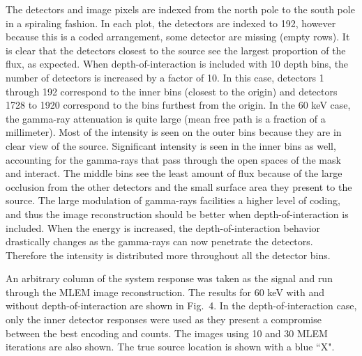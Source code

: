 \documentclass[10pt]{article}
\begin{document}
The detectors and image pixels are indexed from the north pole to the south pole in a spiraling fashion. In each plot, the detectors are indexed to 192, however because this is a coded arrangement, some detector are missing (empty rows). It is clear that the detectors closest to the source see the largest proportion of the flux, as expected. When depth-of-interaction is included with 10 depth bins, the number of detectors is increased by a factor of 10. In this case, detectors 1 through 192 correspond to the inner bins (closest to the origin) and detectors 1728 to 1920 correspond to the bins furthest from the origin. In the 60 keV case, the gamma-ray attenuation is quite large (mean free path is a fraction of a millimeter). Most of the intensity is seen on the outer bins because they are in clear view of the source. Significant intensity is seen in the inner bins as well, accounting for the gamma-rays that pass through the open spaces of the mask and interact. The middle bins see the least amount of flux because of the large occlusion from the other detectors and the small surface area they present to the source. The large modulation of gamma-rays facilities a higher level of coding, and thus the image reconstruction should be better when depth-of-interaction is included. When the energy is increased, the depth-of-interaction behavior drastically changes as the gamma-rays can now penetrate the detectors. Therefore the intensity is distributed more throughout all the detector bins.

An arbitrary column of the system response was taken as the signal and run through the MLEM image reconstruction. The results for 60 keV with and without depth-of-interaction are shown in Fig.~4. In the depth-of-interaction case, only the inner detector responses were used as they present a compromise between the best encoding and counts. The images using 10 and 30 MLEM iterations are also shown. The true source location is shown with a blue ``X".
\end{document}
